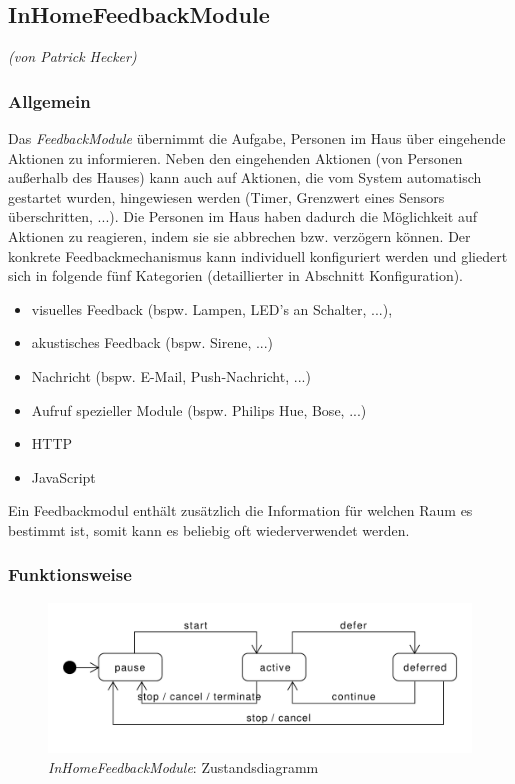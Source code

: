 \newpage
\subsection{InHomeFeedbackModule}
\emph{(von Patrick Hecker)}
\subsubsection{Allgemein}
Das \emph{FeedbackModule} übernimmt die Aufgabe, Personen im Haus über eingehende Aktionen zu informieren. Neben den eingehenden Aktionen (von Personen außerhalb des Hauses) kann auch auf Aktionen, die vom System automatisch gestartet wurden, hingewiesen werden (Timer, Grenzwert eines Sensors überschritten, ...). Die Personen im Haus haben dadurch die Möglichkeit auf Aktionen zu reagieren, indem sie sie abbrechen bzw. verzögern können. Der konkrete Feedbackmechanismus kann individuell konfiguriert werden und gliedert sich in folgende fünf Kategorien (detaillierter in Abschnitt Konfiguration).

\begin{itemize}
	\item visuelles Feedback (bspw. Lampen, LED’s an Schalter, ...),
	\item akustisches Feedback (bspw. Sirene, ...)
	\item Nachricht (bspw. E-Mail, Push-Nachricht, ...)
	\item Aufruf spezieller Module (bspw. Philips Hue, Bose, ...)
	\item HTTP
	\item JavaScript
\end{itemize}
Ein Feedbackmodul enthält zusätzlich die Information für welchen Raum es bestimmt ist, somit kann es beliebig oft wiederverwendet werden.

\subsubsection{Funktionsweise}

\begin{figure}[h!]
	\centering
	\includegraphics[scale=0.7]{img/Modulkonzeption/FeedbackStateMachine.pdf}
	\caption{\emph{InHomeFeedbackModule}: Zustandsdiagramm}
	\label{fig:feedbackStateMachine}
\end{figure}

